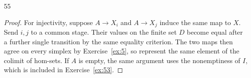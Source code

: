 \begin{exercise}{55}
\begin{proof}
For injectivity, suppose $A\to X_i$ and $A\to X_j$ induce
the same map to $X$.
Send $i,j$ to a common stage.
Their values on the finite set $D$ become equal after a
further single transition by the same equality criterion.
The two maps then agree on every simplex by Exercise~\ref{ex:5},
so represent the same element of the colimit of hom-sets.
If $A$ is empty, the same argument uses the nonemptiness
of $I$, which is included in Exercise~\ref{ex:53}.
\end{proof}
\end{exercise}
